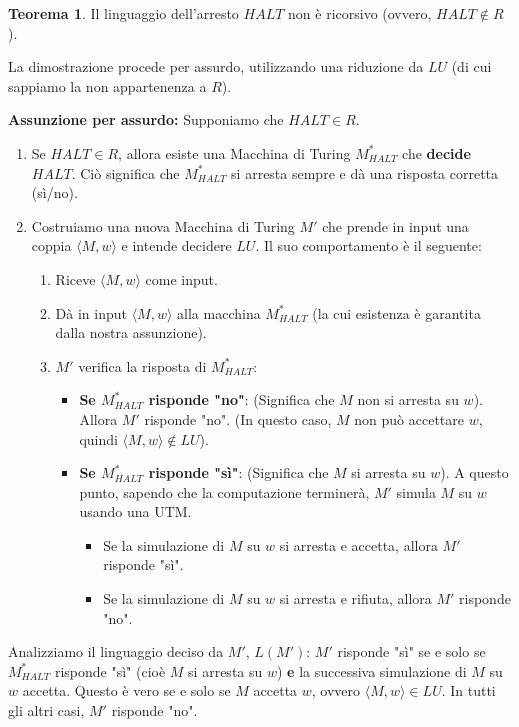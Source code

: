 \documentclass[a4paper]{article}
\makeatletter
\theoremstyle{definition} %
\newtheorem{theorem}{Teorema}
[section] %
\renewenvironment{proof}[1][\proofname]{\par
  \pushQED{\qed}%
  \normalfont \topsep6\p@\@plus6\p@\relax
  \trivlist
  \item[\hskip\labelsep
        \bfseries
    #1\@addpunct{.}]\ignorespaces
}{%
  \popQED\endtrivlist\@endpefalse
}
\makeatother
\begin{document}
\begin{theorem}
Il linguaggio dell'arresto $HALT$ non è ricorsivo (ovvero, $HALT \notin R$).
\end{theorem}
\begin{proof}
La dimostrazione procede per assurdo, utilizzando una riduzione da $LU$ (di cui sappiamo la non appartenenza a $R$).

\textbf{Assunzione per assurdo:} Supponiamo che $HALT \in R$.
\begin{enumerate}
    \item Se $HALT \in R$, allora esiste una Macchina di Turing $M_{HALT}^*$ che \textbf{decide} $HALT$. Ciò significa che $M_{HALT}^*$ si arresta sempre e dà una risposta corretta (sì/no).
    \item Costruiamo una nuova Macchina di Turing $M'$ che prende in input una coppia $\langle M, w \rangle$ e intende decidere $LU$. Il suo comportamento è il seguente:
    \begin{enumerate}
        \item Riceve $\langle M, w \rangle$ come input.
        \item Dà in input $\langle M, w \rangle$ alla macchina $M_{HALT}^*$ (la cui esistenza è garantita dalla nostra assunzione).
        \item $M'$ verifica la risposta di $M_{HALT}^*$:
        \begin{itemize}
            \item \textbf{Se $M_{HALT}^*$ risponde "no"}: (Significa che $M$ non si arresta su $w$). Allora $M'$ risponde "no". (In questo caso, $M$ non può accettare $w$, quindi $\langle M, w \rangle \notin LU$).
            \item \textbf{Se $M_{HALT}^*$ risponde "sì"}: (Significa che $M$ si arresta su $w$). A questo punto, sapendo che la computazione terminerà, $M'$ simula $M$ su $w$ usando una UTM.
            \begin{itemize}
                \item Se la simulazione di $M$ su $w$ si arresta e accetta, allora $M'$ risponde "sì".
                \item Se la simulazione di $M$ su $w$ si arresta e rifiuta, allora $M'$ risponde "no".
            \end{itemize}
        \end{itemize}
    \end{enumerate}
\end{enumerate}
Analizziamo il linguaggio deciso da $M'$, $L(M')$:
$M'$ risponde "sì" se e solo se $M_{HALT}^*$ risponde "sì" (cioè $M$ si arresta su $w$) \textbf{e} la successiva simulazione di $M$ su $w$ accetta. Questo è vero se e solo se $M$ accetta $w$, ovvero $\langle M, w \rangle \in LU$. In tutti gli altri casi, $M'$ risponde "no".


\end{proof}
\end{document}
